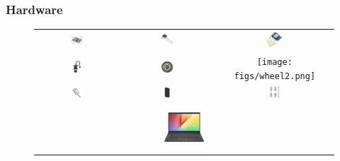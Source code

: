 \documentclass{beamer}
\begin{document}
\begin{frame}
\frametitle{Hardware}
\begin{figure}
	\centering
	\begin{tabular}{ccc} %
		\includegraphics[width=0.2\textwidth]{figs/raspberrypi4.png} & 
		\includegraphics[width=0.15\textwidth]{figs/camera.png} & 
		\includegraphics[width=0.15\textwidth]{figs/GPSNEO6MV2.jpeg} \\
		\includegraphics[width=0.1\textwidth]{figs/parallax.png} & 
		\includegraphics[width=0.15\textwidth]{figs/wheel.png} & 
		\texttt{[image: figs/wheel2.png]} \\
		\includegraphics[width=0.15\textwidth]{figs/googlecoral.png} & 
		\includegraphics[width=0.15\textwidth]{figs/powerbank.png} & 
		\includegraphics[width=0.1\textwidth]{figs/ruedaloca.png} \\
		\multicolumn{3}{c}{
			\includegraphics[width=0.15\textwidth]{figs/ordenador.png}
		}
	\end{tabular}
\end{figure}
\end{frame}
\end{document}
